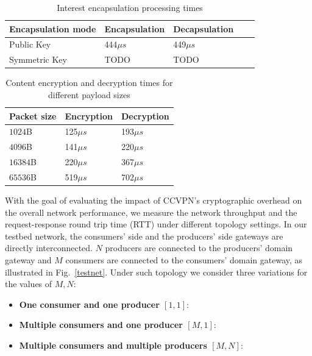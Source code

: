 \begin{table}[!h]
\centering
\caption{Interest encapsulation processing times}
\label{should_be_figure}
\begin{tabular}{|l|l|l|l|l|}
\hline
Encapsulation mode   & Encapsulation & Decapsulation \\ \hline
Public Key  & 444$\mu s$           & 449$\mu s$           \\ \hline \cline{4-5}
Symmetric Key & TODO          & TODO          \\ \hline
\end{tabular}
\end{table}

\begin{table}[!h]
\centering
\caption{Content encryption and decryption times for different payload sizes}
\label{my-label}
\begin{tabular}{|l|l|l|}
\hline
Packet size        & Encryption & Decryption \\ \hline
$1024$B & 125$\mu s$        & 193$\mu s$        \\ \hline
$4096$B & 141$\mu s$        & 220$\mu s$        \\ \hline
$16384$B & 220$\mu s$        & 367$\mu s$        \\ \hline
$65536$B & 519$\mu s$        & 702$\mu s$        \\ \hline
\end{tabular}
\end{table}

With the goal of evaluating the impact of CCVPN's cryptographic overhead on the overall network performance, we measure the network throughput and the request-response round trip time (RTT) under different topology settings.
In our testbed network, the consumers' side and the producers' side gateways are directly interconnected. $N$ producers are connected to the producers' domain gateway and $M$ consumers are connected to the consumers' domain gateway, as illustrated in Fig.~\ref{testnet}.
Under such topology we consider three variations for the values of ${M,N}$:

\begin{itemize}
 \item \textbf{One consumer and one producer $[1,1]$}:
 \item \textbf{Multiple consumers and one producer $[M,1]$}:
 \item \textbf{Multiple consumers and multiple producers $[M,N]$}:
\end{itemize}




